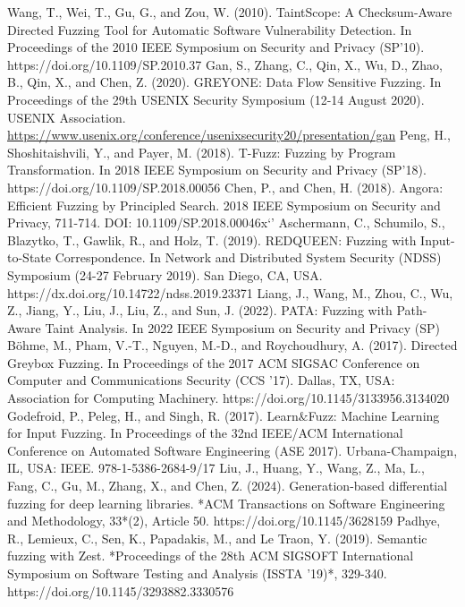 \documentclass[10.5pt,compsoc]{CjC}
\theoremstyle{mystyle}
\begin{document}
\begin{thebibliography}{99}
  Wang, T., Wei, T., Gu, G., and Zou, W. (2010). TaintScope: A Checksum-Aware Directed Fuzzing Tool for Automatic Software Vulnerability Detection. In Proceedings of the 2010 IEEE Symposium on Security and Privacy (SP'10). https://doi.org/10.1109/SP.2010.37
  Gan, S., Zhang, C., Qin, X., Wu, D., Zhao, B., Qin, X., and Chen, Z. (2020). GREYONE: Data Flow Sensitive Fuzzing. In Proceedings of the 29th USENIX Security Symposium (12-14 August 2020). USENIX Association. 
  \url{https://www.usenix.org/conference/usenixsecurity20/presentation/gan}
  Peng, H., Shoshitaishvili, Y., and Payer, M. (2018). T-Fuzz: Fuzzing by Program Transformation. In 2018 IEEE Symposium on Security and Privacy (SP'18). https://doi.org/10.1109/SP.2018.00056
  Chen, P., and Chen, H. (2018). Angora: Efficient Fuzzing by Principled Search. 2018 IEEE Symposium on Security and Privacy, 711-714. DOI: 10.1109/SP.2018.00046x`'
  Aschermann, C., Schumilo, S., Blazytko, T., Gawlik, R., and Holz, T. (2019). REDQUEEN: Fuzzing with Input-to-State Correspondence. In Network and Distributed System Security (NDSS) Symposium (24-27 February 2019). San Diego, CA, USA. https://dx.doi.org/10.14722/ndss.2019.23371
  Liang, J., Wang, M., Zhou, C., Wu, Z., Jiang, Y., Liu, J., Liu, Z., and Sun, J. (2022). PATA: Fuzzing with Path-Aware Taint Analysis. In 2022 IEEE Symposium on Security and Privacy (SP)
  Böhme, M., Pham, V.-T., Nguyen, M.-D., and Roychoudhury, A. (2017). Directed Greybox Fuzzing. In Proceedings of the 2017 ACM SIGSAC Conference on Computer and Communications Security (CCS ’17). Dallas, TX, USA: Association for Computing Machinery. https://doi.org/10.1145/3133956.3134020
  Godefroid, P., Peleg, H., and Singh, R. (2017). Learn$\&$Fuzz: Machine Learning for Input Fuzzing. In Proceedings of the 32nd IEEE/ACM International Conference on Automated Software Engineering (ASE 2017). Urbana-Champaign, IL, USA: IEEE. 978-1-5386-2684-9/17
  Liu, J., Huang, Y., Wang, Z., Ma, L., Fang, C., Gu, M., Zhang, X., and Chen, Z. (2024). Generation-based differential fuzzing for deep learning libraries. *ACM Transactions on Software Engineering and Methodology, 33*(2), Article 50. https://doi.org/10.1145/3628159 
  Padhye, R., Lemieux, C., Sen, K., Papadakis, M., and Le Traon, Y. (2019). Semantic fuzzing with Zest. *Proceedings of the 28th ACM SIGSOFT International Symposium on Software Testing and Analysis (ISSTA '19)*, 329-340. https://doi.org/10.1145/3293882.3330576

\end{thebibliography}
\end{document}
